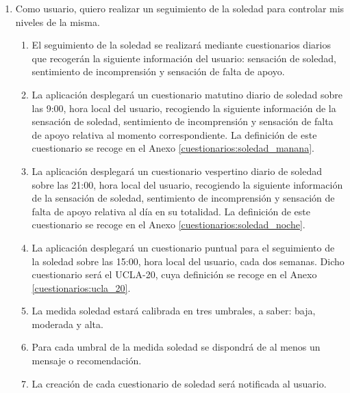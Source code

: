         \begin{enumerate}[resume=req-usuario,label=\textbf{\texttt{RU-\arabic*}}]
            \item \label{req:usuario:seguimiento_soledad} Como usuario, quiero realizar un seguimiento de la soledad para controlar mis niveles de la misma.
            \begin{enumerate}[resume=req-funcionales,label=\textbf{\texttt{RF-\arabic*}}]
                \item \label{req:funcionales:soledad_diario_info} El seguimiento de la soledad se realizará mediante cuestionarios diarios que recogerán la siguiente información del usuario: sensación de soledad, sentimiento de incomprensión y sensación de falta de apoyo.
                \item \label{req:funcionales:soledad_diario_manana} La aplicación desplegará un cuestionario matutino diario de soledad sobre las 9:00, hora local del usuario, recogiendo la siguiente información de la sensación de soledad, sentimiento de incomprensión y sensación de falta de apoyo relativa al momento correspondiente. La definición de este cuestionario se recoge en el Anexo \ref{cuestionarios:soledad_manana}.
                \item \label{req:funcionales:soledad_diario_noche}  La aplicación desplegará un cuestionario vespertino diario de soledad sobre las 21:00, hora local del usuario, recogiendo la siguiente información de la sensación de soledad, sentimiento de incomprensión y sensación de falta de apoyo relativa al día en su totalidad. La definición de este cuestionario se recoge en el Anexo \ref{cuestionarios:soledad_noche}.
                \item \label{req:funcionales:soledad_puntual} La aplicación desplegará un cuestionario puntual para el seguimiento de la soledad sobre las 15:00, hora local del usuario, cada dos semanas. Dicho cuestionario será el UCLA-20, cuya definición se recoge en el Anexo \ref{cuestionarios:ucla_20}.
                \item \label{req:funcionales:soledad_umbrales} La medida soledad estará calibrada en tres umbrales, a saber: baja, moderada y alta.
                \item \label{req:funcionales:soledad_umbrales_consejo} Para cada umbral de la medida soledad se dispondrá de al menos un mensaje o recomendación.
                \item \label{req:funcionales:soledad_notificacion} La creación de cada cuestionario de soledad será notificada al usuario.

\end{enumerate}
\end{enumerate}
